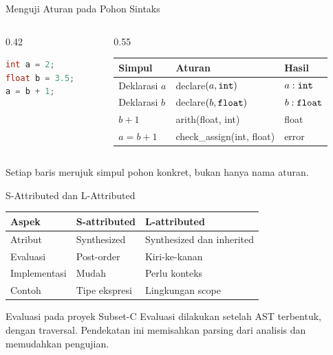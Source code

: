 \documentclass[aspectratio=169,10pt,t]{beamer}
\begin{document}
\begin{frame}[fragile]{Menguji Aturan pada Pohon Sintaks}
  \begin{columns}[T,onlytextwidth]
    \begin{column}{0.42\textwidth}
      \begin{lstlisting}[language=C,numbers=none,
        caption={Program uji aturan semantik}]
int a = 2;
float b = 3.5;
a = b + 1;
      \end{lstlisting}
    \end{column}
    \begin{column}{0.55\textwidth}
      \scriptsize
      \setlength{\tabcolsep}{3pt}
      \begin{tabular}{@{}p{2.1cm}p{3.3cm}p{1.8cm}@{}}
        \toprule
        \textbf{Simpul} & \textbf{Aturan} & \textbf{Hasil} \\
        \midrule
        Deklarasi \(a\) & declare\((a,\texttt{int})\) & \(a:\texttt{int}\) \\
        Deklarasi \(b\) & declare\((b,\texttt{float})\) & \(b:\texttt{float}\) \\
        \(b+1\) & arith(float, int) & float \\
        \(a=b+1\) & check\_assign(int, float) & error \\
        \bottomrule
      \end{tabular}
    \end{column}
  \end{columns}

  \vspace{4pt}
  {\footnotesize\color{ubbblue!80}Setiap baris merujuk simpul pohon
  konkret, bukan hanya nama aturan.}
\end{frame}

\begin{frame}{S-Attributed dan L-Attributed}
  \small
  \setlength{\tabcolsep}{4pt}
  \begin{tabular}{@{}p{3.0cm}p{4.8cm}p{4.8cm}@{}}
    \toprule
    \textbf{Aspek} & \textbf{S-attributed} & \textbf{L-attributed} \\
    \midrule
    Atribut & Synthesized & Synthesized dan inherited \\
    Evaluasi & Post-order & Kiri-ke-kanan \\
    Implementasi & Mudah & Perlu konteks \\
    Contoh & Tipe ekspresi & Lingkungan scope \\
    \bottomrule
  \end{tabular}

  \vspace{5pt}
  \begin{block}{Evaluasi pada proyek Subset-C}
    \footnotesize
    Evaluasi dilakukan setelah AST terbentuk, dengan traversal.
    Pendekatan ini memisahkan parsing dari analisis dan memudahkan
    pengujian.
  \end{block}
\end{frame}
\end{document}
